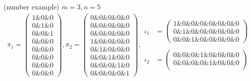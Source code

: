 \begin{example}{(number example)}
$m = 3, n = 5$
\begin{align*}
\pi_{1} = \begin{pmatrix}
1 \ampersand 0 \ampersand 0 \\
0 \ampersand 1 \ampersand 0 \\
0 \ampersand 0 \ampersand 1 \\
0 \ampersand 0 \ampersand 0 \\
0 \ampersand 0 \ampersand 0 \\
0 \ampersand 0 \ampersand 0 \\
0 \ampersand 0 \ampersand 0 \\
0 \ampersand 0 \ampersand 0
\end{pmatrix},
\pi_{2} = \begin{pmatrix}
0 \ampersand 0 \ampersand 0 \ampersand 0 \ampersand 0 \\
0 \ampersand 0 \ampersand 0 \ampersand 0 \ampersand 0 \\
0 \ampersand 0 \ampersand 0 \ampersand 0 \ampersand 0 \\
1 \ampersand 0 \ampersand 0 \ampersand 0 \ampersand 0 \\
0 \ampersand 1 \ampersand 0 \ampersand 0 \ampersand 0 \\
0 \ampersand 0 \ampersand 1 \ampersand 0 \ampersand 0 \\
0 \ampersand 0 \ampersand 0 \ampersand 1 \ampersand 0 \\
0 \ampersand 0 \ampersand 0 \ampersand 0 \ampersand 1
\end{pmatrix}, 
\begin{array}{rr}
\iota_{1} &= \begin{pmatrix}
1 \ampersand 0 \ampersand 0 \ampersand 0 \ampersand 0 \ampersand 0 \ampersand 0 \ampersand 0 \\
0 \ampersand 1 \ampersand 0 \ampersand 0 \ampersand 0 \ampersand 0 \ampersand 0 \ampersand 0 \\
0 \ampersand 0 \ampersand 1 \ampersand 0 \ampersand 0 \ampersand 0 \ampersand 0 \ampersand 0
\end{pmatrix} \\
\\
\iota_{2} &= \begin{pmatrix}
0 \ampersand 0 \ampersand 0 \ampersand 1 \ampersand 0 \ampersand 0 \ampersand 0 \ampersand 0 \\
0 \ampersand 0 \ampersand 0 \ampersand 0 \ampersand 1 \ampersand 0 \ampersand 0 \ampersand 0 \\

\end{pmatrix}
\end{array}
\end{align*}
\end{example}
